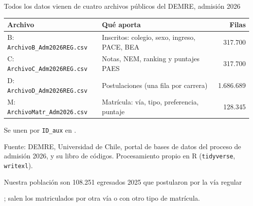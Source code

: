 \begin{frame}{Todos los datos vienen de cuatro archivos públicos del DEMRE, admisión 2026}
  \begin{center}
  \small
  \begin{tabular}{llr}
    \toprule
    \textbf{Archivo} & \textbf{Qué aporta} & \textbf{Filas} \\
    \midrule
    B: \texttt{ArchivoB\_Adm2026REG.csv} & Inscritos: colegio, sexo, ingreso, PACE, BEA & 317.700 \\
    C: \texttt{ArchivoC\_Adm2026REG.csv} & Notas, NEM, ranking y puntajes PAES & 317.700 \\
    D: \texttt{ArchivoD\_Adm2026REG.csv} & Postulaciones (una fila por carrera) & 1.686.689 \\
    M: \texttt{ArchivoMatr\_Adm2026.csv} & Matrícula: vía, tipo, preferencia, puntaje & 128.345 \\
    \bottomrule
  \end{tabular}
  \end{center}
  \medskip
  Se unen por \texttt{ID\_aux} en .
  \vfill
  {\footnotesize Fuente: DEMRE, Universidad de Chile, portal de bases de datos
  del proceso de admisión 2026, y su libro de códigos. Procesamiento propio
  en R (\texttt{tidyverse}, \texttt{writexl}).\par}
\end{frame}

\begin{frame}{Nuestra población son 108.251 egresados 2025 que postularon por la vía regular}
  \begin{center}
  \end{center}
  \medskip
  ; salen los matriculados por
  otra vía o con otro tipo de matrícula.
\end{frame}

